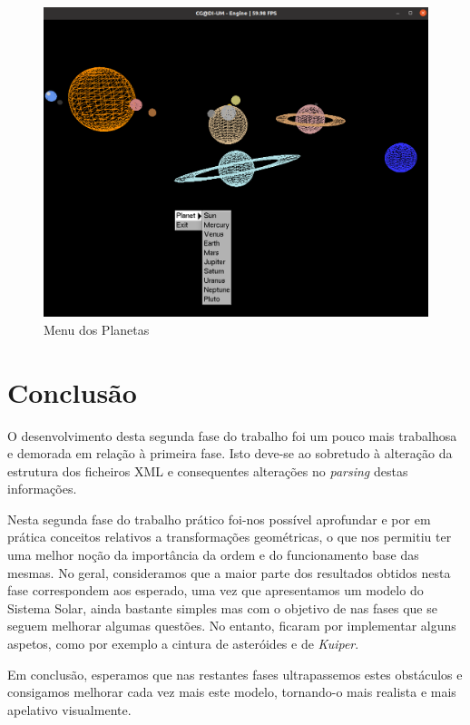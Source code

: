 \documentclass[a4paper, 11pt]{article}
\begin{document}
\

\begin{figure}[H]
    \centering
    \includegraphics[width=.7\textwidth]{img/menu.png}
    \caption{Menu dos Planetas}
\end{figure}

\pagebreak

\section{Conclusão}

O desenvolvimento desta segunda fase do trabalho foi um pouco mais trabalhosa e
demorada em relação à primeira fase. Isto deve-se ao sobretudo à alteração da estrutura
dos ficheiros XML e consequentes alterações no \textit{parsing} destas informações.

Nesta segunda fase do trabalho prático foi-nos possível aprofundar e por em prática
conceitos relativos a transformações geométricas, o que nos permitiu ter uma melhor
noção da importância da ordem e do funcionamento base das mesmas. No geral, consideramos
que a maior parte dos resultados obtidos nesta fase correspondem aos esperado, uma vez
que apresentamos um modelo do Sistema Solar, ainda bastante simples mas com o objetivo de
nas fases que se seguem melhorar algumas questões. No entanto, ficaram por implementar alguns
aspetos, como por exemplo a cintura de asteróides e de \textit{Kuiper}.

Em conclusão, esperamos que nas restantes fases ultrapassemos estes obstáculos e consigamos
melhorar cada vez mais este modelo, tornando-o mais realista e mais apelativo visualmente.
\end{document}
